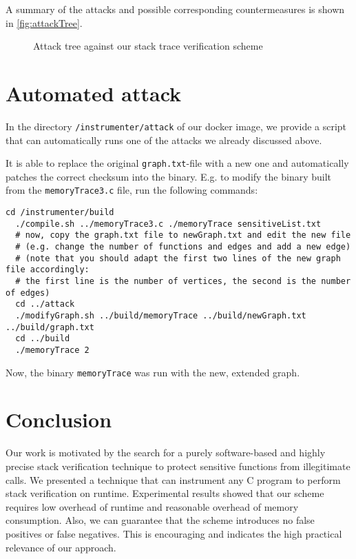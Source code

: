 \documentclass{llncs}
\begin{document}
A summary of the attacks and possible corresponding countermeasures is shown in \autoref{fig:attackTree}.
\begin{figure}[htb]
\hspace*{-2cm} \scalebox{.6}{
\begin{forest}
[Authenticate Caller, proTree
  [Static Patching
    [Change response\\
mechanism, proTree]
    [Remove Stack\\
Verification, proTree]
    [Introspection, oppTree]
  ]
  [Dynamic Patching
    [Instrument Stack\\
Verification]
    [Jump after shadow\\
stack building function]
  ]
  [Modify Reference\\
Call Graph
    [Find Digest
      [White-Box\\
Crypto, oppTree]
    ]
  ]
]
\end{forest}}
\caption{Attack tree against our stack trace verification scheme}
\label{fig:attackTree}
\end{figure}

\section{Automated attack}
In the directory \texttt{/instrumenter/attack} of our docker image, we provide a script that can automatically runs one of the attacks we already discussed above.

It is able to replace the original \texttt{graph.txt}-file with a new one and automatically patches the correct checksum into the binary. E.g. to modify the binary built from the \texttt{memoryTrace3.c} file, run the following commands:
\begin{lstlisting}[basicstyle=\scriptsize]
  cd /instrumenter/build
  ./compile.sh ../memoryTrace3.c ./memoryTrace sensitiveList.txt
  # now, copy the graph.txt file to newGraph.txt and edit the new file
  # (e.g. change the number of functions and edges and add a new edge)
  # (note that you should adapt the first two lines of the new graph file accordingly:
  # the first line is the number of vertices, the second is the number of edges)
  cd ../attack
  ./modifyGraph.sh ../build/memoryTrace ../build/newGraph.txt ../build/graph.txt
  cd ../build
  ./memoryTrace 2
\end{lstlisting}
Now, the binary \texttt{memoryTrace} was run with the new, extended graph.

\section{Conclusion}
Our work is motivated by the search for a purely software-based and highly precise stack verification technique to protect sensitive functions from illegitimate calls. We presented a technique that can instrument any C program to perform stack verification on runtime. Experimental results showed that our scheme requires low overhead of runtime and reasonable overhead of memory consumption. Also, we can guarantee that the scheme introduces no false positives or false negatives. This is encouraging and indicates the high practical relevance of our approach.
\end{document}
